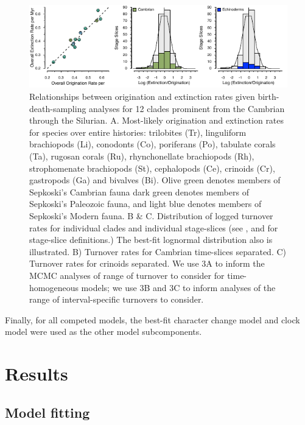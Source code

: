 \documentclass{article}
\begin{document}
\begin{figure}
  \includegraphics[width=\textwidth]{figures/Turnover PaleoStyle.pdf}

  \caption{Relationships between origination and extinction rates given birth-death-sampling analyses for 12 clades prominent from the Cambrian through the Silurian.  A. Most-likely origination and extinction rates for species over entire histories: trilobites (Tr), linguliform brachiopods (Li), conodonts (Co), poriferans (Po), tabulate corals (Ta), rugosan corals (Ru), rhynchonellate brachiopods (Rh), strophomenate brachiopods (St), cephalopods (Ce), crinoids (Cr), gastropods (Ga) and bivalves (Bi). Olive green denotes members of Sepkoski's Cambrian fauna \citep{Sepkoski1981} dark green denotes members of Sepkoski's Paleozoic fauna, and light blue denotes members of Sepkoski's Modern fauna. B \& C. Distribution of logged turnover rates for individual clades and individual stage-slices (see \cite{Bergstrom2009}, \cite{Cramer2011} and \cite{Rasmussen2019} for stage-slice definitions.)  The best-fit lognormal distribution also is illustrated.  B) Turnover rates for Cambrian time-slices separated.  C) Turnover rates for crinoids separated.  We use 3A to inform the MCMC analyses of range of turnover to consider for time-homogeneous models; we use 3B and 3C to inform analyses of the range of interval-specific turnovers to consider.} %
\end{figure}

Finally, for all competed models, the best-fit character change model and clock model were used as the other model subcomponents.

\section{Results}

\subsection{Model fitting}
\end{document}
